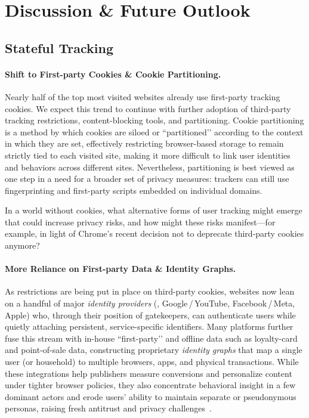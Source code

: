 \vspace{-1mm}
\section{Discussion \& Future Outlook}
\label{sec:future-outlook}
\vspace{-1mm}

\subsection{Stateful Tracking}
\vspace{-4mm}
\paragraph{Shift to First-party Cookies \& Cookie Partitioning.}
Nearly half of the top most visited websites already use first-party tracking cookies. We expect this trend to continue with further adoption of third-party tracking restrictions, content-blocking tools, and partitioning.
%
Cookie partitioning is a method by which cookies are siloed or ``partitioned’’ according to the context in which they are set, effectively restricting browser-based storage to remain strictly tied to each visited site, making it more difficult to link user identities and behaviors across different sites.
%
Nevertheless, partitioning is best viewed as one step in a need for a broader set of privacy measures: trackers can still use fingerprinting and first-party scripts embedded on individual domains.

\begin{opbox}
In a world without cookies, what alternative forms of user tracking might emerge that could increase privacy risks, and how might these risks manifest---for example, in light of Chrome’s recent decision not to deprecate third-party cookies anymore?
\end{opbox}
\vspace{-3mm}


\paragraph{More Reliance on First-party Data \& Identity Graphs.}
\label{sec:id-providers}
As restrictions are being put in place on third-party cookies, websites now lean on a handful of major \emph{identity providers} (\eg{}, Google\,/\,YouTube, Facebook\,/\,Meta, Apple) who, through their position of gatekeepers, can authenticate users while quietly attaching persistent, service-specific identifiers. 
%
Many platforms further fuse this stream with in-house ``first-party’’ and offline data such as loyalty-card and point-of-sale data, constructing proprietary \emph{identity graphs} that map a single user (or household) to multiple browsers, apps, and physical transactions.
%
While these integrations help publishers measure conversions and personalize content under tighter browser policies, they also concentrate behavioral insight in a few dominant actors and erode users’ ability to maintain separate or pseudonymous personas, raising fresh antitrust and privacy challenges~\cite{TargetedAdvertisingAutorite2025,khanAmazonsAntitrustParadox2017,munirGooglesChromeAntitrust2024}.


